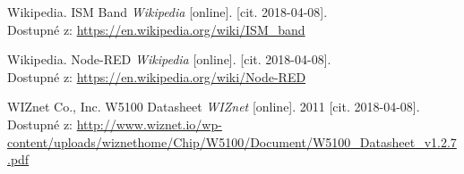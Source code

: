 \documentclass[12pt,a4paper]{article}
\begin{document}
\begin{thebibliography}{99}
Wikipedia. ISM Band \emph{Wikipedia} [online]. [cit. 2018-04-08]. \\ Dostupné z: \url{https://en.wikipedia.org/wiki/ISM\_band}

Wikipedia. Node-RED \emph{Wikipedia} [online]. [cit. 2018-04-08]. \\ Dostupné z: \url{https://en.wikipedia.org/wiki/Node-RED}

WIZnet Co., Inc. W5100 Datasheet \emph{WIZnet} [online]. 2011 [cit. 2018-04-08]. \\ Dostupné z: \url{http://www.wiznet.io/wp-content/uploads/wiznethome/Chip/W5100/Document/W5100_Datasheet_v1.2.7.pdf}

\end{thebibliography}

\newpage

\listoffigures


\listoftables

\end{document}
